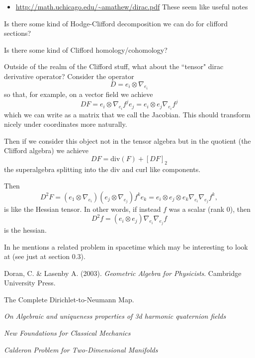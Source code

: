 \begin{itemize}
    \item \url{http://math.uchicago.edu/~amathew/dirac.pdf} These seem like useful notes
\end{itemize}

\begin{question}
    Is there some kind of Hodge-Clifford decomposition we can do for clifford sections?
\end{question}

\begin{question}
Is there some kind of Clifford homology/cohomology?
\end{question}

Outside of the realm of the Clifford stuff, what about the ``tensor" dirac derivative operator?  Consider the operator
\[
D = e_i \otimes \nabla_{e_i}
\]
so that, for example, on a vector field we achieve
\[
DF = e_i \otimes \nabla_{e_i}f^j e_j = e_i \otimes e_j \nabla_{e_i} f^j
\]
which we can write as a matrix that we call the Jacobian. This should transform nicely under coordinates more naturally.

Then if we consider this object not in the tensor algebra but in the quotient (the Clifford algebra) we achieve
\[
DF = \textrm{div}(F) + [DF]_2
\]
the superalgebra splitting into the div and curl like components.

Then
\[
D^2F = (e_1 \otimes \nabla_{e_i})(e_j\otimes \nabla_{e_j})f^ke_{k} = e_i \otimes e_j \otimes e_k \nabla_{e_i} \nabla_{e_j} f^k,
\]
is like the Hessian tensor. In other words, if instead $f$ was a scalar (rank 0), then
\[
D^2f = (e_i \otimes e_j) \nabla_{e_i} \nabla_{e_j} f
\]
is the hessian.

In \cite{belishev_two_dimensional} he mentions a related problem in spacetime which may be interesting to look at (see just at section 0.3).


\newpage
\begin{thebibliography}{1}
    
 Doran, C. \& Lasenby A. (2003). \emph{Geometric Algebra for Physicists}. Cambridge University Press.

 The Complete Dirichlet-to-Neumann Map.

 \emph{On Algebraic and uniqueness properties of 3d harmonic quaternion fields}

 \emph{New Foundations for Classical Mechanics}

 \emph{Calderon Problem for Two-Dimensional Manifolds}
	
	
\end{thebibliography}

